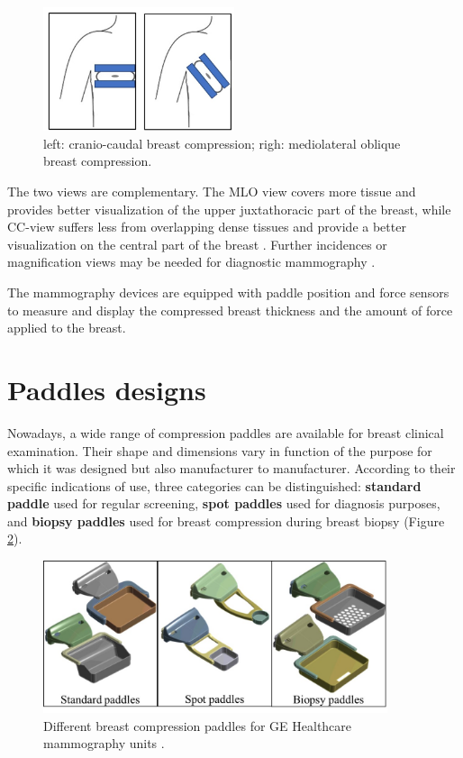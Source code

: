 \begin{figure}[!h]
\centering
\includegraphics[width=0.5\textwidth,keepaspectratio]{figures/cc_mlo_view.jpg} 
\caption{left: cranio-caudal breast compression; righ: mediolateral oblique breast compression. }
\label{fig:cc_mlo_view}
\end{figure}

 The two views are complementary. The MLO view covers more tissue and provides better visualization of the upper juxtathoracic part of the breast, while CC-view suffers less from overlapping dense tissues and provide a better visualization on the central part of the breast \citep{chan_image_1987,kim_computer_2006}.  Further incidences or magnification views may be needed for diagnostic mammography \citep{groot_towards_2015}.
 

The mammography devices are equipped with paddle position and force sensors to measure and display the compressed breast thickness and the amount of force applied to the breast.

\section{Paddles designs} \label{section:compressionpaddlesdesign}

Nowadays, a wide range of compression paddles are available for breast clinical examination. Their shape and dimensions vary in function of the purpose for which it was designed but also manufacturer to manufacturer. According to their specific
indications of use, three categories can be distinguished: \textbf{standard paddle} used for regular screening, \textbf{spot paddles} used for diagnosis purposes, and \textbf{biopsy paddles} used for breast compression during breast biopsy (Figure \ref{fig:compressionpaddlestypes}). 


\begin{figure}[!h]
\centering
\includegraphics[width=0.9\textwidth,keepaspectratio]{figures/compressionpaddlestypes.jpg} 
\caption{Different breast compression paddles for GE Healthcare mammography units .}\label{fig:compressionpaddlestypes}
\end{figure}
    

